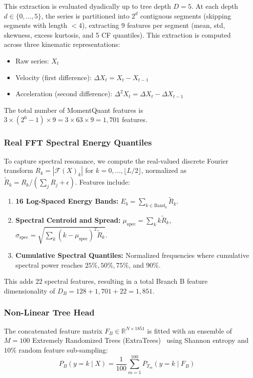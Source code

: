 \documentclass[journal,twocolumn]{article}
\begin{document}
This extraction is evaluated dyadically up to tree depth $D = 5$. At each depth $d \in \{0, \dots, 5\}$, the series is partitioned into $2^d$ contiguous segments (skipping segments with length $< 4$), extracting $9$ features per segment (mean, std, skewness, excess kurtosis, and 5 CF quantiles). This extraction is computed across three kinematic representations:
\begin{itemize}
    \item Raw series: $X_t$
    \item Velocity (first difference): $\Delta X_t = X_t - X_{t-1}$
    \item Acceleration (second difference): $\Delta^2 X_t = \Delta X_t - \Delta X_{t-1}$
\end{itemize}
The total number of MomentQuant features is $3 \times (2^6 - 1) \times 9 = 3 \times 63 \times 9 = 1,701$ features.

\subsubsection{Real FFT Spectral Energy Quantiles}
To capture spectral resonance, we compute the real-valued discrete Fourier transform $R_k = |\mathcal{F}(X)_k|$ for $k = 0, \dots, \lfloor L/2 \rfloor$, normalized as $\tilde{R}_k = R_k / (\sum_j R_j + \epsilon)$. Features include:
\begin{enumerate}
    \item \textbf{16 Log-Spaced Energy Bands:} $E_b = \sum_{k \in \text{Band}_b} \tilde{R}_k$.
    \item \textbf{Spectral Centroid and Spread:} $\mu_{\text{spec}} = \sum_k k \tilde{R}_k$, $\sigma_{\text{spec}} = \sqrt{\sum_k (k - \mu_{\text{spec}})^2 \tilde{R}_k}$.
    \item \textbf{Cumulative Spectral Quantiles:} Normalized frequencies where cumulative spectral power reaches $25\%, 50\%, 75\%$, and $90\%$.
\end{enumerate}
This adds 22 spectral features, resulting in a total Branch B feature dimensionality of $D_B = 128 + 1,701 + 22 = 1,851$.

\subsubsection{Non-Linear Tree Head}
The concatenated feature matrix $F_B \in \mathbb{R}^{N \times 1851}$ is fitted with an ensemble of $M = 100$ Extremely Randomized Trees (ExtraTrees)~\cite{geurts2006extremely} using Shannon entropy and $10\%$ random feature sub-sampling:
\begin{equation}
    P_B(y = k \mid X) = \frac{1}{100} \sum_{m=1}^{100} P_{T_m}(y = k \mid F_B)
    \label{eq:prob_b}
\end{equation}
\end{document}
